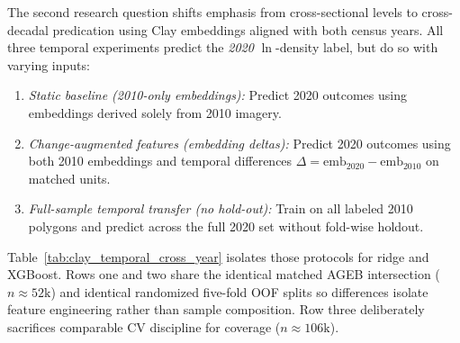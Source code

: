 \documentclass[12pt,letterpaper]{article}
\begin{document}
The second research question shifts emphasis from cross-sectional levels to cross-decadal predication using Clay embeddings aligned with both census years. All three temporal experiments predict the \emph{2020} $\ln$-density label, but do so with varying inputs:
\begin{enumerate}
  \item \emph{Static baseline (2010-only embeddings):} Predict 2020 outcomes using embeddings derived solely from 2010 imagery.
  
  \item \emph{Change-augmented features (embedding deltas):} Predict 2020 outcomes using both 2010 embeddings and temporal differences $\Delta = \mathrm{emb}_{2020} - \mathrm{emb}_{2010}$ on matched units.
  
  \item \emph{Full-sample temporal transfer (no hold-out):} Train on all labeled 2010 polygons and predict across the full 2020 set without fold-wise holdout.
\end{enumerate}


Table~\ref{tab:clay_temporal_cross_year} isolates those protocols for ridge and XGBoost. Rows one and two share the identical matched AGEB intersection ($n\approx 52\mathrm{k}$) and identical randomized five-fold OOF splits so differences isolate feature engineering rather than sample composition. Row three deliberately sacrifices comparable CV discipline for coverage ($n\approx 106\mathrm{k}$).

  
\end{document}
